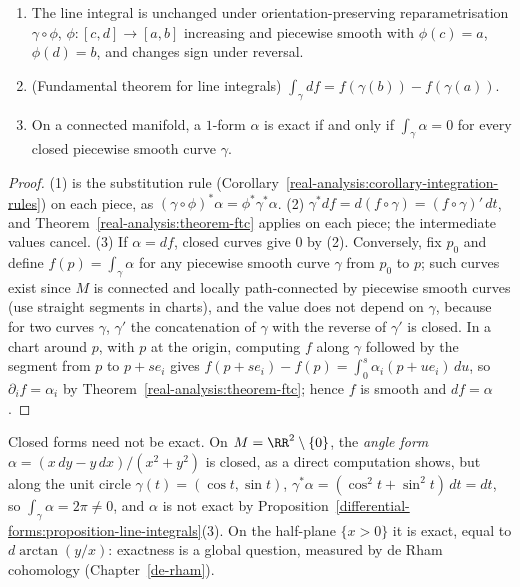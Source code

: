 \begin{proposition}\label{differential-forms:proposition-line-integrals}
\begin{enumerate}
\item The line integral is unchanged under orientation-preserving reparametrisation $\gamma \circ \phi$, $\phi \colon [c, d] \to [a, b]$ increasing and piecewise smooth with $\phi(c) = a$, $\phi(d) = b$, and changes sign under reversal.
\item (Fundamental theorem for line integrals) $\int_\gamma df = f(\gamma(b)) - f(\gamma(a))$.
\item On a connected manifold, a $1$-form $\alpha$ is exact if and only if $\int_\gamma\alpha = 0$ for every closed piecewise smooth curve $\gamma$.
\end{enumerate}
\end{proposition}

\begin{proof}
(1) is the substitution rule (Corollary~\ref{real-analysis:corollary-integration-rules}) on each piece, as $(\gamma \circ \phi)^*\alpha = \phi^*\gamma^*\alpha$. (2) $\gamma^*df = d(f \circ \gamma) = (f \circ \gamma)'\,dt$, and
Theorem~\ref{real-analysis:theorem-ftc} applies on each piece; the intermediate values cancel. (3) If $\alpha = df$, closed curves give $0$ by (2). Conversely, fix $p_0$ and define $f(p) = \int_\gamma\alpha$ for any piecewise smooth curve
$\gamma$ from $p_0$ to $p$; such curves exist since $M$ is connected and locally path-connected by piecewise smooth curves (use straight segments in charts), and the value does not depend on $\gamma$, because for two
curves $\gamma$, $\gamma'$ the concatenation of $\gamma$ with the reverse of $\gamma'$ is closed. In a chart around $p$, with $p$ at the origin, computing $f$ along $\gamma$ followed by the segment from $p$ to $p + se_i$ gives
$f(p + se_i) - f(p) = \int_0^s\alpha_i(p + ue_i)\,du$, so $\partial_if = \alpha_i$ by Theorem~\ref{real-analysis:theorem-ftc}; hence $f$ is smooth and $df = \alpha$.
\end{proof}

\begin{counterexample}\label{differential-forms:counterexample-closed-not-exact}
Closed forms need not be exact. On $M = \RR^2 \setminus \{0\}$, the \emph{angle form} $\alpha = (x\,dy - y\,dx)/(x^2 + y^2)$ is closed, as a direct computation shows, but along the unit circle $\gamma(t) = (\cos t, \sin t)$,
$\gamma^*\alpha = (\cos^2t + \sin^2t)\,dt = dt$, so $\int_\gamma\alpha = 2\pi \neq 0$, and $\alpha$ is not exact by Proposition~\ref{differential-forms:proposition-line-integrals}(3). On the half-plane $\{x > 0\}$ it is exact, equal to
$d\arctan(y/x)$: exactness is a global question, measured by de Rham cohomology (Chapter~\ref{de-rham}).
\end{counterexample}

